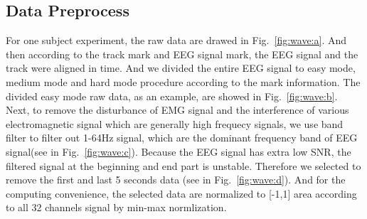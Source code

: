 \documentclass[runningheads,a4paper]{llncs}
\begin{document}
\subsection{Data Preprocess}
For one subject experiment, the raw data are drawed in Fig.~\ref{fig:wave:a}.
And then according to the track mark and EEG signal mark, the EEG signal and
the track were aligned in time. And we divided the entire EEG signal to
easy mode, medium mode and hard mode procedure according to the mark information.
The divided easy mode raw data, as an example, are showed in Fig.~\ref{fig:wave:b}.
Next, to remove the disturbance of EMG signal and the interference of various
electromagnetic signal which are generally high frequecy signals, we use band
filter to filter out 1-64Hz signal, which are the dominant frequency band of EEG
signal(see in Fig.~\ref{fig:wave:c}). Because the EEG signal has extra low SNR,
the filtered signal at the beginning and end part is unstable. Therefore we selected
to remove the first and last 5 seconds data (see in Fig.~\ref{fig:wave:d}).
And for the computing convenience, the selected data are normalized to [-1,1] area
according to all 32 channels signal by min-max normlization.
\end{document}
